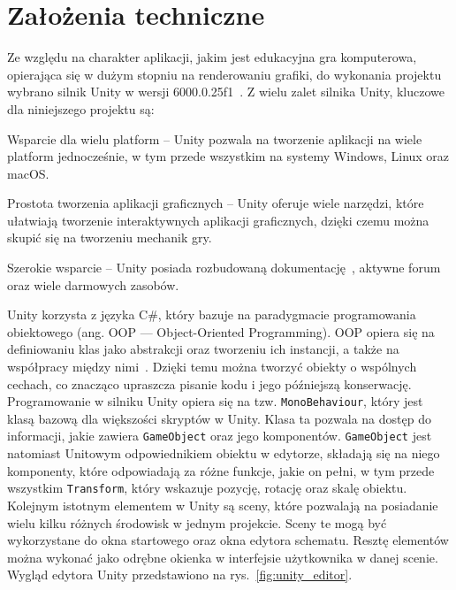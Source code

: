 \section{Założenia techniczne}
\label{sec:zalozenia_techniczne}

Ze względu na charakter aplikacji, jakim jest edukacyjna gra komputerowa,
opierająca się w dużym stopniu na renderowaniu grafiki,
do wykonania projektu wybrano silnik Unity w wersji 6000.0.25f1~\cite{unity_site}.
Z wielu zalet silnika Unity, kluczowe dla niniejszego projektu są:

\begin{citemize}
    \item Wsparcie dla wielu platform --
    Unity pozwala na tworzenie aplikacji na wiele platform jednocześnie, w tym przede wszystkim na systemy Windows, Linux oraz macOS.
    \item Prostota tworzenia aplikacji graficznych --
    Unity oferuje wiele narzędzi, które ułatwiają tworzenie interaktywnych aplikacji graficznych,
    dzięki czemu można skupić się na tworzeniu mechanik gry.
    \item Szerokie wsparcie --
    Unity posiada rozbudowaną dokumentację~\cite{unity_docs},
    aktywne forum~\cite{unity_forum} oraz wiele darmowych zasobów.
\end{citemize}


Unity korzysta z języka C\#,
który bazuje na paradygmacie programowania obiektowego (ang. OOP — Object-Oriented Programming).
OOP opiera się na definiowaniu klas jako abstrakcji oraz tworzeniu ich instancji,
a także na współpracy między nimi~\cite{nygaard1986basic}.
Dzięki temu można tworzyć obiekty o wspólnych cechach,
co znacząco upraszcza pisanie kodu i jego późniejszą konserwację.\\
\indent Programowanie w silniku Unity opiera się na tzw. \texttt{MonoBehaviour},
który jest klasą bazową dla większości skryptów w Unity.
Klasa ta pozwala na dostęp do informacji, jakie zawiera \texttt{GameObject} oraz jego komponentów.
\texttt{GameObject} jest natomiast Unitowym odpowiednikiem obiektu w edytorze,
składają się na niego komponenty, które odpowiadają za różne funkcje, jakie on pełni,
w tym przede wszystkim \texttt{Transform}, który wskazuje pozycję, rotację oraz skalę obiektu.\\
\indent Kolejnym istotnym elementem w Unity są sceny,
które pozwalają na posiadanie wielu kilku różnych środowisk w jednym projekcie.
Sceny te mogą być wykorzystane do okna startowego oraz okna edytora schematu.
Resztę elementów można wykonać jako odrębne okienka w interfejsie użytkownika w danej scenie.
Wygląd edytora Unity przedstawiono na rys.~\ref{fig:unity_editor}.

